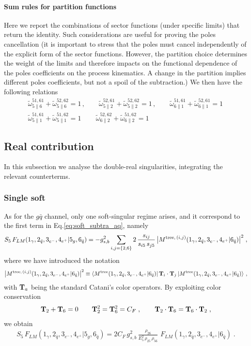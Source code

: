 \documentclass[12pt,a4paper]{article}
\newcommand{\nn}{\nonumber}
\newcommand{\beq}{\begin{eqnarray}}
\newcommand{\eeq}{\end{eqnarray}}
\newcommand{\barq}{{\bar{q}}}
\def\bra#1{%
  \left\langle\smash{#1}{\vphantom1}\right|}
\def\ket#1{%
  \left|\smash{#1}{\vphantom1}\right\rangle}
\begin{document}
 \paragraph{Sum rules for partition functions}
 Here we report the combinations of sector functions (under specific limits)
 that return the identity. Such considerations are useful for proving the
 poles cancellation (it is important to stress that the poles must cancel 
 independently of the explicit form of the sector functions. However, the partition
 choice determines the weight of the limits and therefore impacts on the 
 functional dependence of the poles coefficients on the process kinematics.
 A change in the partition implies different poles coefficients, but not a spoil 
 of the subtraction.)
 We then have the following relations
\beq
\tilde{\omega}^{51,61}_{5 \parallel 6}
  +
\tilde{\omega}^{52,62}_{5 \parallel 6}
=
1
\, ,
\qquad
\tilde{\omega}^{52,61}_{5 \parallel 2}
  +
\tilde{\omega}^{52,62}_{5 \parallel 2}
=
1 \, , 
\qquad
\tilde{\omega}^{51,61}_{6 \parallel 1}
  +
\tilde{\omega}^{52,61}_{6 \parallel 1}
= 
1 \, 
\nn \\
\tilde{\omega}^{51,61}_{5 \parallel 1}
  +
\tilde{\omega}^{51,62}_{5 \parallel 1}
=
1 \, 
\qquad
\tilde{\omega}^{52,62}_{6 \parallel 2}
  +
\tilde{\omega}^{51,62}_{6 \parallel 2}
=
1
\eeq





\subsection{Real contribution}
In this subsection we analyse the double-real singularities, integrating the relevant counterterms.

\subsubsection{Single soft}

As for the $g \barq$ channel, only one soft-singular regime arises, and it correspond to the first term in Eq.\eqref{eq:soft_subtra_aq}, namely
 \beq
S_{5} \, F_{LM}(1_\gamma,2_{\bar{q}},3_{e^-},4_{e^+} |5_g, 6_{\bar{q}})
 = -  g_{s,b}^2 \sum_{\substack{i,j= \{2, 6\}}}
2 \,  \frac{s_{ij}}{s_{i5} \,s_{j5}} \, \big| M^{{\rm tree}, \, (i,j)}(1_\gamma,2_{\bar{q}},3_{e^-},4_{e^+} | 6_{\bar{q}})\big|^2 \; ,
\eeq
where we have introduced the notation
\beq
  \big| M^{{\rm tree}, \, (i,j)}(1_\gamma,2_{\bar{q}},3_{e^-},4_{e^+} | 6_{\bar{q}})\big|^2 
 \equiv
 \bra{M^{{\rm tree}}(1_\gamma,2_{\bar{q}},3_{e^-},4_{e^+} | 6_{\bar{q}})}{\bf T}_i \cdot {\bf T}_j
\ket{M^{{\rm tree}}(1_\gamma,2_{\bar{q}},3_{e^-},4_{e^+} | 6_{\bar{q}})} \, ,
\eeq
with ${\bf T}_a$ being the standard Catani's color operators.
By exploiting color conservation 
\beq
{\bf T}_2 + {\bf T}_6  =0
\qquad 
{\bf T}_2^2 = {\bf T}_6^2  = C_{F} \; , 
\qquad 
{\bf T}_2 \cdot {\bf T}_6 = {\bf T}_6 \cdot {\bf T}_2 \; ,
\eeq
we obtain
\beq
S_{5} \, F_{LM}(1_\gamma,2_{\bar{q}},3_{e^-},4_{e^+} |5_g, 6_{\bar{q}})
=
 2 C_F \,  g_{s,b}^2 \,  
 \frac{\rho_{26}}{E_5^2 \, \rho_{25}\,  \rho_{56}} \, 
 \, F_{LM}(1_\gamma,2_{\bar{q}},3_{e^-},4_{e^+} | 6_{\bar{q}}) \; .
 \eeq
 
\end{document}

